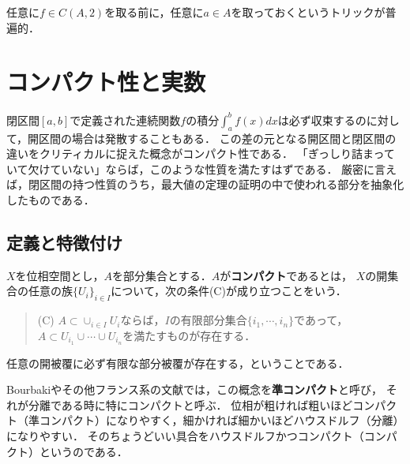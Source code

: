 \documentclass[uplatex,dvipdfmx]{jsreport}
\begin{document}
\begin{screen}
    \begin{remarks}
        任意に$f\in C(A,2)$を取る前に，任意に$a\in A$を取っておくというトリックが普遍的．
    \end{remarks}
\end{screen}

\section{コンパクト性と実数}

\begin{tcolorbox}[colframe=ForestGreen, colback=ForestGreen!10!white, breakable ,colbacktitle=ForestGreen!40!white, coltitle=black,fonttitle=\bfseries\sffamily
    ,title=コンパクト性]
    閉区間$[a,b]$で定義された連続関数$f$の積分$\int^b_af(x)dx$は必ず収束するのに対して，開区間の場合は発散することもある．
    この差の元となる開区間と閉区間の違いをクリティカルに捉えた概念がコンパクト性である．
    「ぎっしり詰まっていて欠けていない」ならば，このような性質を満たすはずである．
    厳密に言えば，閉区間の持つ性質のうち，最大値の定理の証明の中で使われる部分を抽象化したものである．
\end{tcolorbox}

\subsection{定義と特徴付け}

\begin{definition}[compact]
    $X$を位相空間とし，$A$を部分集合とする．$A$が\textbf{コンパクト}であるとは，
    $X$の開集合の任意の族$\{U_i\}_{i\in I}$について，次の条件(C)が成り立つことをいう．
    \begin{quote}
        (C) $A\subset\cup_{i\in I}U_i$ならば，$I$の有限部分集合$\{i_1,\cdots,i_n\}$であって，$A\subset U_{i_1}\cup\cdots\cup U_{i_n}$を満たすものが存在する．
    \end{quote}
    任意の開被覆に必ず有限な部分被覆が存在する，ということである．
\end{definition}
\begin{remark}[quasicompact]\label{remark-quasicompcat}
    Bourbakiやその他フランス系の文献では，この概念を\textbf{準コンパクト}と呼び，
    それが分離である時に特にコンパクトと呼ぶ．
    位相が粗ければ粗いほどコンパクト（準コンパクト）になりやすく，細かければ細かいほどハウスドルフ（分離）になりやすい．
    そのちょうどいい具合をハウスドルフかつコンパクト（コンパクト）というのである．
\end{remark}
\end{document}
